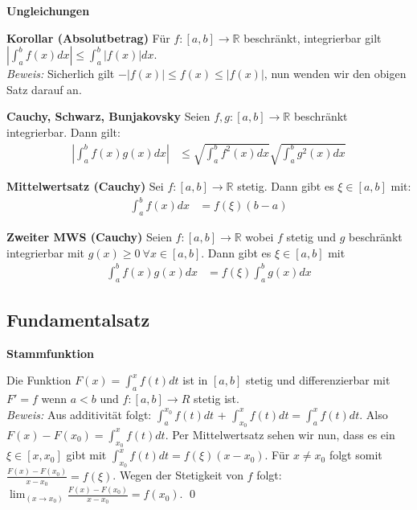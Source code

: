 \documentclass[25pt]{sciposter}
\newcommand{\R}{\mathbb{R}}
\newenvironment{method}[1]{\begin{mdframed}[backgroundcolor=blue!10,innertopmargin=15pt, innerbottommargin=15pt, nobreak=true]
		\textbf{#1 }
	}
	{ 
	\end{mdframed}
}
\begin{document}
\begin{multicols}{3}
\begin{method}{Ungleichungen}
	\textbf{Korollar (Absolutbetrag)} Für $f:[a,b]\to \R$ beschränkt, integrierbar gilt $\left| \int_{a}^{b} f(x) dx \right| \leq \int_{a}^{b} |f(x)| dx $.\\
	\textit{Beweis:} Sicherlich gilt $-|f(x)| \leq f(x) \leq |f(x)|$, nun wenden wir den obigen Satz darauf an.
\end{method}


\begin{method}{Cauchy, Schwarz, Bunjakovsky} Seien $f,g : [a,b] \to \R$ beschränkt integrierbar. Dann gilt:
	\begin{align*}
		\left| \int_{a}^{b} f(x) g(x)  dx \right| &\leq \sqrt{\int_{a}^{b} f^2(x) dx}\sqrt{\int_{a}^{b} g^2(x) dx}
	\end{align*}
\end{method}



\begin{method}{Mittelwertsatz (Cauchy)} Sei $f : [a,b] \to \R$ stetig. Dann gibt es $\xi \in [a,b]$ mit:
	\begin{align*}
		\int_{a}^{b} f(x) dx &= f(\xi) (b-a)
	\end{align*}
\end{method}


\begin{method}{Zweiter MWS (Cauchy)} Seien $f:[a,b] \to \R$ wobei $f$ stetig und $g$ beschränkt integrierbar mit $g(x)\geq 0 \ \forall x \in [a,b]$. Dann gibt es $\xi \in [a,b]$ mit 
	\begin{align*}
		\int_{a}^{b} f(x) g(x) dx &= f (\xi) \int_{a}^{b} g(x) dx
	\end{align*}
\end{method}


\subsection*{Fundamentalsatz}
\begin{method}{Stammfunktion}
Die Funktion $F(x) = \int_{a}^{x} f(t) dt$ ist in $[a,b]$ stetig und differenzierbar mit $F' = f$ wenn $a<b$ und $f:[a,b]\to R$ stetig ist. \\
\textit{Beweis:} Aus additivität folgt: $\int_{a}^{x_0} f(t) dt$ + $\int_{x_0}^{x} f(t) dt = \int_{a}^{x} f(t) dt$. Also $F(x) - F(x_0) = \int_{x_0}^{x} f(t) dt$. Per Mittelwertsatz sehen wir nun, dass es ein $\xi \in [x,x_0]$ gibt mit $\int_{x_0}^{x} f(t) dt = f(\xi) (x-x_0) $. Für $x \not = x_0$ folgt somit $\frac{F(x) - F(x_0)}{x-x_0} = f(\xi)$. Wegen der Stetigkeit von $f$ folgt: $\lim_{(x\to x_0)} \frac{F(x) - F(x_0)}{x-x_0} = f(x_0)$. \qed
\end{method}



\end{multicols}
\end{document}
